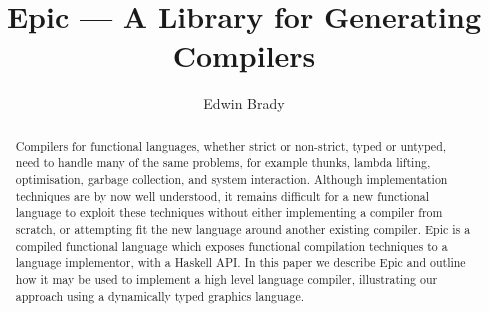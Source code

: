 \documentclass[orivec,dvips,10pt]{llncs}
\newcounter{per}
\begin{document}
\title{Epic --- A Library for Generating Compilers}
\author{Edwin Brady}


\maketitle

\begin{abstract}
Compilers for functional languages, whether strict or non-strict,
typed or untyped, need to handle many of the same problems, for
example thunks, lambda lifting, optimisation, garbage collection, and
system interaction.  Although implementation techniques are by now
well understood, it remains difficult for a new functional language to
exploit these techniques without either implementing a compiler from
scratch, or attempting fit the new language around another existing
compiler.
Epic is a compiled functional language which exposes functional
compilation techniques to a language implementor, with a Haskell
API. In this paper we describe Epic and outline how it may
be used to implement a high level language compiler, illustrating our
approach using a dynamically typed graphics language.

\end{abstract}









%

%






\begin{small}


\appendix

%

\end{small}
\end{document}

